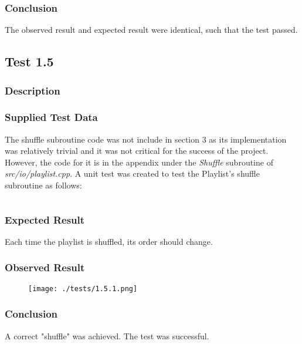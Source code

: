 \subsubsection*{Conclusion}
The observed result and expected result were identical, such that the test passed.

\pagebreak
\subsection{Test 1.5}
\subsubsection*{Description}
\paragraph{}
{
	\centering
}

\subsubsection*{Supplied Test Data}
The shuffle subroutine code was not include in section 3 as its implementation was relatively trivial and it was not critical for the success of the project. However, the code for it is in the appendix under the \textit{Shuffle} subroutine of \textit{src/io/playlist.cpp}. A unit test was created to test the Playlist's shuffle subroutine as follows:
\inputminted[linenos]{c++}{../unit_tests/shuffle.cpp}

\subsubsection*{Expected Result}
Each time the playlist is shuffled, its order should change.

\subsubsection*{Observed Result}
\label{sec:evidence1.5}
\begin{figure}[H]
	\texttt{[image: ./tests/1.5.1.png]}
\end{figure}

\subsubsection*{Conclusion}
A correct "shuffle" was achieved. The test was successful.

